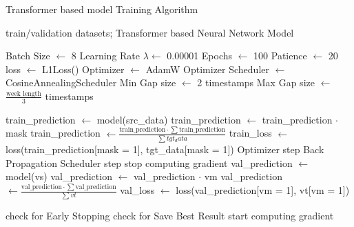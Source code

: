 \begin{algorithm}[H]
	\caption{Transformer based model Training Algorithm}\label{alg:gabtraining}
	\begin{algorithmic}
		\Require train/validation datasets; Transformer based Neural Network Model

		\State Batch Size $\gets$ 8
		\State Learning Rate $\lambda \gets$ 0.00001
		\State Epochs $\gets$ 100
		\State Patience $\gets$ 20
		\State loss $\gets$ L1Loss()
		\State Optimizer $\gets$ AdamW Optimizer
		\State Scheduler $\gets$ CosineAnnealingScheduler
		\State Min Gap size $\gets$ 2 timestamps
		\State Max Gap size $\gets$ $\frac{\text{week length}}{3}$ timestamps
		\State

		\State train\_prediction $\gets$ model(src\_data) 
		\State train\_prediction $\gets$ train\_prediction $\cdot$ mask
		\State train\_prediction $\gets \frac{\text{train\_prediction} \cdot \sum\text{train\_prediction}}{\sum tgt_data}$ 
		\State train\_loss $\gets$ loss(train\_prediction[mask = 1], tgt\_data[mask = 1])
		\State Optimizer step
		\State Back Propagation
		\EndFor
		\State Scheduler step
		\State stop computing gradient
		\State val\_prediction $\gets$ model(vs) 
		\State val\_prediction $\gets$ val\_prediction $\cdot$ vm
		\State val\_prediction $\gets \frac{\text{val\_prediction} \cdot \sum\text{val\_prediction}}{\sum vt}$ 
		\State val\_loss $\gets$ loss(val\_prediction[vm = 1], vt[vm = 1])
		\EndFor

		\State check for Early Stopping
		\State check for Save Best Result
		\State start computing gradient
		\EndFor
	\end{algorithmic}
\end{algorithm}
